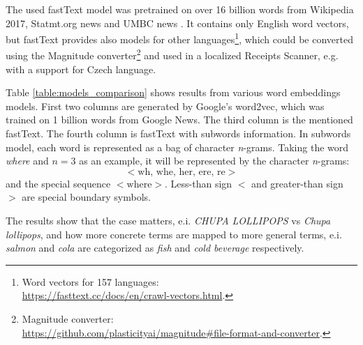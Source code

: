 \documentclass[
  digital, %
  table,   %
  oneside, %
  lof,     %
  lot,     %
]{fithesis3}
\begin{document}
The used fastText model was pretrained on over 16 billion words from Wikipedia 2017, Statmt.org news and UMBC news \cite{Mikolov2018Advances}. It contains only English word vectors, but fastText provides also models for other languages\footnote{Word vectors for 157 languages:\\ \url{https://fasttext.cc/docs/en/crawl-vectors.html}.}, which could be converted using the Magnitude converter\footnote{Magnitude converter:\\ \url{https://github.com/plasticityai/magnitude\#file-format-and-converter}.} and used in a localized Receipts Scanner, e.g. with a support for Czech language.

Table \ref{table:models_comparison} shows results from various word embeddings models. First two columns are generated by Google's word2vec, which was trained on 1 billion words from Google News. The third column is the mentioned fastText. The fourth column is fastText with subwords information. In subwords model, each word is represented as a bag of character \textit{n}-grams. Taking the
word \textit{where} and $n = 3$ as an example, it will be
represented by the character \textit{n}-grams:
\[
<\text{wh, whe, her, ere, re}>
\]
and the special sequence $<\text{where}>$. Less-than sign $<$ and greater-than sign $>$ are special boundary symbols. \cite{BojanowskiEtal2017Enriching}

The results show that the case matters, e.i. \textit{CHUPA LOLLIPOPS} vs \textit{Chupa lollipops}, and how more concrete terms are mapped to more general terms, e.i. \textit{salmon} and \textit{cola} are categorized as \textit{fish} and \textit{cold beverage} respectively.
\end{document}
